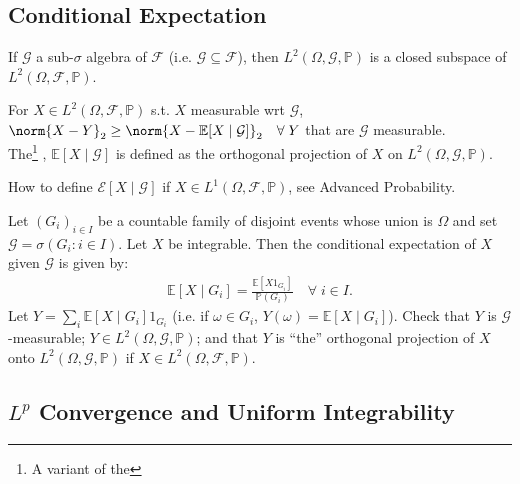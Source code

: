 \subsection{Conditional Expectation}



If $\mathcal{G}$ a sub-$\sigma$ algebra of $\mathcal{F}$ (i.e. $\mathcal{G} \subseteq \mathcal{F}$), then $L^2(\Omega, \mathcal{G}, \mathbb{P})$ is a closed subspace of $L^2(\Omega, \mathcal{F}, \mathbb{P})$.

\begin{definition}
	For $X \in L^2(\Omega, \mathcal{F}, \mathbb{P})$ s.t. $X$ measurable wrt $\mathcal{G}$, $\norm{X - Y}_2 \geq \norm{X - \mathbb{E}[X \mid \mathcal{G}]}_2 \quad \forall \; Y$ that are $\mathcal{G}$ measurable.\\
	The\footnote{A variant of the} , $\mathbb{E}[X \mid \mathcal{G}]$ is defined as the orthogonal projection of $X$ on $L^2(\Omega, \mathcal{G}, \mathbb{P})$.
\end{definition}

\begin{question}
	How to define $\mathcal{E}[X \mid \mathcal{G}]$ if $X \in L^1(\Omega, \mathcal{F}, \mathbb{P})$, see Advanced Probability.
\end{question}

\begin{example}
	Let $(G_i)_{i \in I}$ be a countable family of disjoint events whose union is $\Omega$ and set $\mathcal{G} = \sigma(G_i : i \in I)$.
	Let $X$ be integrable.
	Then the conditional expectation of $X$ given $\mathcal{G}$ is given by:
	\begin{align*}
		\mathbb{E}[X \mid G_i] = \frac{\mathbb{E}[X 1_{G_i}]}{\mathbb{P}(G_i)} \quad \forall \; i \in I.
	\end{align*}
	Let $Y = \sum_i \mathbb{E}[X \mid G_i] 1_{G_i}$ (i.e. if $\omega \in G_i$, $Y(\omega) = \mathbb{E}[X \mid G_i]$).
	Check that $Y$ is $\mathcal{G}$-measurable; $Y \in L^2(\Omega, \mathcal{G}, \mathbb{P})$; and that $Y$ is ``the'' orthogonal projection of $X$ onto $L^2(\Omega, \mathcal{G}, \mathbb{P})$ if $X \in L^2(\Omega, \mathcal{F}, \mathbb{P})$.
\end{example}

\subsection{$L^p$ Convergence and Uniform Integrability}

